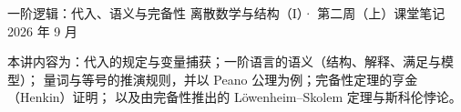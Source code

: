 \documentclass[cjk]{loom}
\begin{document}
\loomcover
  {一阶逻辑：代入、语义与完备性}
  {离散数学与结构（I）· 第二周（上）课堂笔记}
  {}
  {2026 年 9 月}

\begin{strand}
本讲内容为：代入的规定与变量捕获；一阶语言的语义（结构、解释、满足与模型）；
量词与等号的推演规则，并以 Peano 公理为例；完备性定理的亨金（Henkin）证明；
以及由完备性推出的 Löwenheim--Skolem 定理与斯科伦悖论。
\end{strand}

\clearpage
{\small\tableofcontents}

\clearpage





\end{document}
